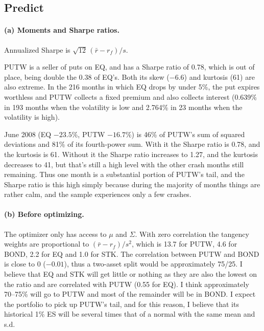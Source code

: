 \documentclass[11pt]{article}
\newcommand{\tbl}[1]{}
\begin{document}
\subsection*{Predict}

\paragraph{(a) Moments and Sharpe ratios.} Annualized Sharpe is $\sqrt{12}\,(\bar r-r_f)/s$.

\begin{table}[H]
\centering\small
\caption{Monthly moments, annualized mean and vol, annualized Sharpe ratio.}
\label{tab:p4mom}
\tbl{p4_moments}
\end{table}

PUTW is a seller of puts on EQ, and has a Sharpe ratio of 0.78, which is out of place, being double the 0.38 of EQ's. Both its skew ($-6.6$) and kurtosis (61) are also extreme. In the 216 months in which EQ drops by under 5\%, the put expires worthless and PUTW collects a fixed premium and also collects interest (0.639\% in 193 months when the volatility is low and 2.764\% in 23 months when the volatility is high).

\begin{table}[H]
\centering\small
\caption{Each asset's most extreme month: its share of the sums of squared and fourth-power deviations, and the moments without it.}
\resizebox{\textwidth}{!}{\tbl{p4_single_month}}
\end{table}

June 2008 (EQ $-23.5\%$, PUTW $-16.7\%$) is 46\% of PUTW's sum of squared deviations and 81\% of its fourth-power sum. With it the Sharpe ratio is 0.78, and the kurtosis is 61. Without it the Sharpe ratio increases to 1.27, and the kurtosis decreases to 41, but that's still a high level with the other crash months still remaining. Thus one month is a substantial portion of PUTW's tail, and the Sharpe ratio is this high simply because during the majority of months things are rather calm, and the sample experiences only a few crashes.

\paragraph{(b) Before optimizing.} The optimizer only has access to $\mu$ and $\Sigma$. With zero correlation the tangency weights are proportional to $(\bar r-r_f)/s^2$, which is 13.7 for PUTW, 4.6 for BOND, 2.2 for EQ and 1.0 for STK. The correlation between PUTW and BOND is close to 0 ($-0.01$), thus a two-asset split would be approximately 75/25. I believe that EQ and STK will get little or nothing as they are also the lowest on the ratio and are correlated with PUTW (0.55 for EQ). I think approximately 70--75\% will go to PUTW and most of the remainder will be in BOND. I expect the portfolio to pick up PUTW's tail, and for this reason, I believe that its historical 1\% ES will be several times that of a normal with the same mean and s.d.
\end{document}
